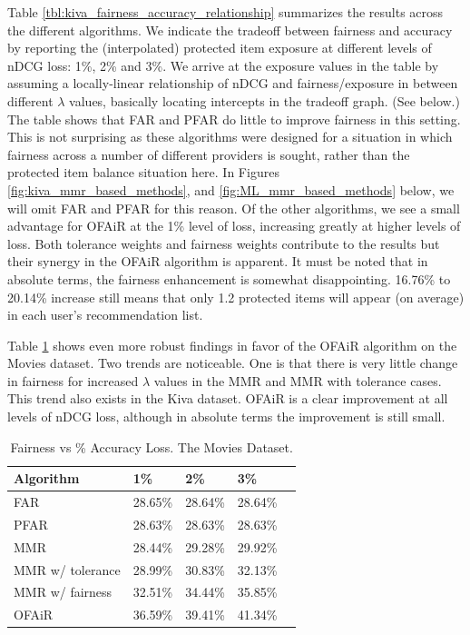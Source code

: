 Table \ref{tbl:kiva_fairness_accuracy_relationship} summarizes the results across the different algorithms. We indicate the tradeoff between fairness and accuracy by reporting the (interpolated) protected item exposure at different levels of nDCG loss: 1\%, 2\% and 3\%. We arrive at the exposure values in the table by assuming a locally-linear relationship of nDCG and fairness/exposure in between different $\lambda$ values, basically locating intercepts in the tradeoff graph. (See below.) The table shows that FAR and PFAR do little to improve fairness in this setting. This is not surprising as these algorithms were designed for a situation in which fairness across a number of different providers is sought, rather than the protected item balance situation here. In Figures \ref{fig:kiva_mmr_based_methods}, and \ref{fig:ML_mmr_based_methods} below, we will omit FAR and PFAR for this reason. Of the other algorithms, we see a small advantage for OFAiR at the 1\% level of loss, increasing greatly at higher levels of loss. Both tolerance weights and fairness weights contribute to the results but their synergy in the OFAiR algorithm is apparent. It must be noted that in absolute terms, the fairness enhancement is somewhat disappointing. 16.76\% to 20.14\% increase still means that only 1.2 protected items will appear (on average) in each user's recommendation list. 

Table \ref{tbl:ML_fairness_accuracy_relationship} shows even more robust findings in favor of the OFAiR algorithm on the Movies dataset. Two trends are noticeable. One is that there is very little change in fairness for increased $\lambda$ values in the MMR and MMR with tolerance cases. This trend also exists in the Kiva dataset. OFAiR is a clear improvement at all levels of nDCG loss, although in absolute terms the improvement is still small.


\begin{table}[]
\centering
\begin{tabular}{lllll}
 
 Algorithm &  1\% & 2\% & 3\% \\
 \hline
 FAR & 28.65\% & 28.64\% & 28.64\% \\
 PFAR & 28.63\% & 28.63\% & 28.63\% \\
 MMR &  28.44\% & 29.28\% & 29.92\% \\
 MMR w/ tolerance & 28.99\% & 30.83\% & 32.13\%  \\
 MMR w/ fairness & 32.51\% & 34.44\% & 35.85\%  \\
 OFAiR & 36.59\% & 39.41\% & 41.34\% \\
 
 \hline
\end{tabular}
\caption{Fairness vs \% Accuracy Loss. The Movies Dataset.}
\label{tbl:ML_fairness_accuracy_relationship}
\end{table}

